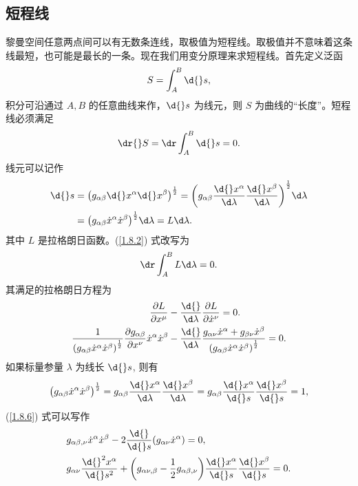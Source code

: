 \documentclass[UTF8, 12pt, a4paper, oneside, onecolumn, fontset=none]{ctexart}
\begin{document}
\subsection{短程线}
黎曼空间任意两点间可以有无数条连线，取极值为短程线。取极值并不意味着这条线最短，也可能是最长的一条。现在我们用变分原理来求短程线。首先定义泛函
\begin{equation}
S=\int_{A}^{B}\d{}s,
\end{equation}
积分可沿通过 $A, B$ 的任意曲线来作，$\d{}s$ 为线元，则 $S$ 为曲线的“长度”。短程线必须满足
\begin{equation}
\dr{}S=\dr\int_{A}^{B}\d{}s=0.\label{1.8.2}
\end{equation}
线元可以记作
\begin{align}
\d{}s&=\mleft(g_{\alpha\beta}\d{}x^{\alpha}\d{}x^{\beta}\mright)^{\frac{1}{2}}=\mleft(g_{\alpha\beta}\frac{\d{}x^{\alpha}}{\d\lambda}\frac{\d{}x^{\beta}}{\d\lambda}\mright)^{\frac{1}{2}}\d\lambda\notag\\
&=\mleft(g_{\alpha\beta}\dot{x}^{\alpha}\dot{x}^{\beta}\mright)^{\frac{1}{2}}\d\lambda=L\d\lambda.
\end{align}
其中 $L$ 是拉格朗日函数。(\ref{1.8.2}) 式改写为
\begin{equation}
\dr\int_{A}^{B}L\d\lambda=0.
\end{equation}
其满足的拉格朗日方程为
\begin{align}
\frac{\partial{}L}{\partial{}x^{\mu}}&-\frac{\d{}}{\d\lambda}\frac{\partial{}L}{\partial\dot{x}^{\nu}}=0.\\
\frac{1}{\mleft(g_{\alpha\beta}\dot{x}^{\alpha}\dot{x}^{\beta}\mright)^{\frac{1}{2}}}\frac{\partial{}g_{\alpha\beta}}{\partial{}x^{\nu}}\dot{x}^{\alpha}\dot{x}^{\beta}&-\frac{\d{}}{\d\lambda}\frac{g_{\alpha\nu}\dot{x}^{\alpha}+g_{\beta\nu}\dot{x}^{\beta}}{\mleft(g_{\alpha\beta}\dot{x}^{\alpha}\dot{x}^{\beta}\mright)^{\frac{1}{2}}}=0.\label{1.8.6}
\end{align}
如果标量参量 $\lambda$ 为线长 $\d{}s$, 则有
\begin{equation}
\mleft(g_{\alpha\beta}\dot{x}^{\alpha}\dot{x}^{\beta}\mright)^{\frac{1}{2}}=g_{\alpha\beta}\frac{\d{}x^{\alpha}}{\d\lambda}\frac{\d{}x^{\beta}}{\d\lambda}=g_{\alpha\beta}\frac{\d{}x^{\alpha}}{\d{}s}\frac{\d{}x^{\beta}}{\d{}s}=1,
\end{equation}
(\ref{1.8.6}) 式可以写作
\begin{align}
&g_{\alpha\beta,\nu}\dot{x}^{\alpha}\dot{x}^{\beta}-2\frac{\d{}}{\d{}s}\mleft(g_{\alpha\nu}\dot{x}^{\alpha}\mright)=0,\notag\\
&g_{\alpha\nu}\frac{\d{}^{2}x^{\alpha}}{\d{}s^{2}}+\mleft(g_{\alpha\nu,\beta}-\frac{1}{2}g_{\alpha\beta,\nu}\mright)\frac{\d{}x^{\alpha}}{\d{}s}\frac{\d{}x^{\beta}}{\d{}s}=0.\label{1.8.8}
\end{align}
\end{document}
